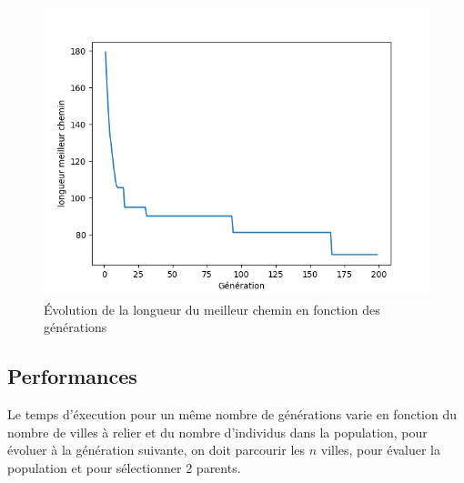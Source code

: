 \documentclass[11pt]{article}
\begin{document}
\begin{figure}[H]
\centering
\includegraphics[width=.9\linewidth]{./evol.png}
\caption{Évolution de la longueur du meilleur chemin en fonction des générations}
\end{figure}

\subsection{Performances}

Le temps d'éxecution pour un même nombre de générations varie en fonction du nombre de villes à relier et du nombre
d'individus dans la population, pour évoluer à la génération suivante, on doit parcourir les $n$ villes, pour évaluer
la population et pour sélectionner 2 parents. 
\end{document}
